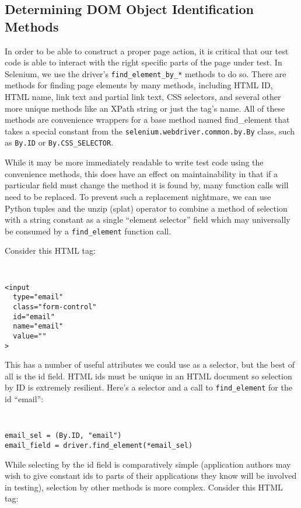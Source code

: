 \subsection{Determining DOM Object Identification Methods}
In order to be able to construct a proper page action, it is critical that our test code is able to interact with the right specific parts of the page under test. In Selenium, we use the driver's \texttt{find\_element\_by\_*} methods to do so. There are methods for finding page elements by many methods, including HTML ID, HTML name, link text and partial link text, CSS selectors, and several other more unique methods like an XPath string or just the tag's name. All of these methods are convenience wrappers for a base method named find\_element that takes a special constant from the \texttt{selenium.webdriver.common.by.By} class, such as \texttt{By.ID} or \texttt{By.CSS\_SELECTOR}.

While it may be more immediately readable to write test code using the convenience methods, this does have an effect on maintainability in that if a particular field must change the method it is found by, many function calls will need to be replaced.\citep{gupta2003dom} To prevent such a replacement nightmare, we can use Python tuples and the unzip (splat) operator to combine a method of selection with a string constant as a single ``element selector'' field which may universally be consumed by a \texttt{find\_element} function call.

Consider this HTML tag:

{\tt
\begin{verbatim}
<input
  type="email"
  class="form-control"
  id="email"
  name="email"
  value=""
>
\end{verbatim}
}

This has a number of useful attributes we could use as a selector, but the best of all is the id field. HTML ids must be unique in an HTML document \citep{HTMLStan99} so selection by ID is extremely resilient. Here's a selector and a call to \texttt{find\_element} for the id ``email'':

{\tt
\begin{verbatim}
email_sel = (By.ID, "email")
email_field = driver.find_element(*email_sel)
\end{verbatim}
}

While selecting by the id field is comparatively simple (application authors may wish to give constant ids to parts of their applications they know will be involved in testing)\citep{DOMStand78}, selection by other methods is more complex. Consider this HTML tag:

